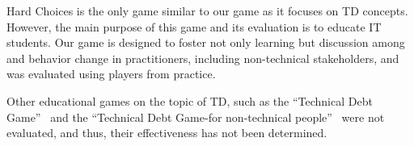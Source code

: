         Hard Choices is the only game similar to our game as it focuses on TD concepts. 
        However, the main purpose of this game and its evaluation is to educate IT students.
        Our game is designed to foster not only learning but discussion among and behavior change in practitioners, including non-technical stakeholders, and was evaluated using players from practice. 

        Other educational games on the topic of TD, such as the ``Technical Debt Game''~\cite{TDGame1} and the ``Technical Debt Game-for non-technical people''~\cite{TDGame2} were not evaluated, and thus, their effectiveness has not been determined. 

